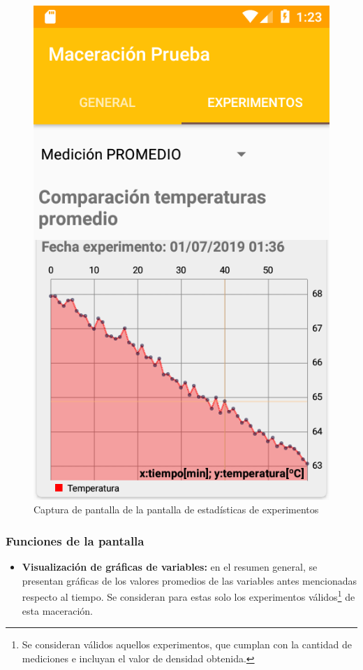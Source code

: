             \begin{figure}[h]
                \centering
                \includegraphics[scale=0.2]{software/ScreenCapture/ExperimentStatistics.jpg}
                \caption{Captura de pantalla de la pantalla de estadísticas de experimentos}
                \label{fig:CapturaExpFrag}
            \end{figure}
            
            \subsubsection{Funciones de la pantalla}
            \begin{itemize}
                \item \textbf{Visualización de gráficas de variables:} en el resumen general, se presentan gráficas de los valores promedios de las variables antes mencionadas respecto al tiempo. Se consideran para estas solo los experimentos válidos\footnote{Se consideran válidos aquellos experimentos, que cumplan con la cantidad de mediciones e incluyan el valor de densidad obtenida.} de esta maceración.
            \end{itemize}
            
